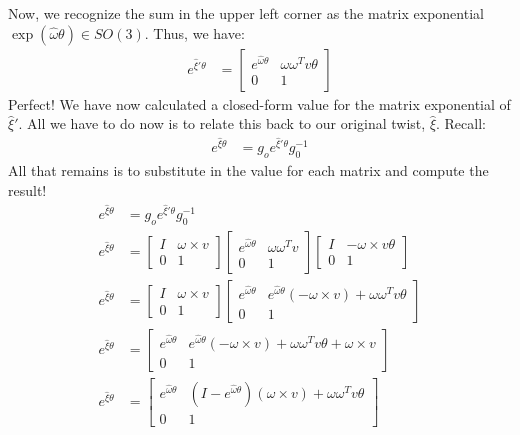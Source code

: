 \documentclass[oneside]{book}
\begin{document}
Now, we recognize the sum in the upper left corner as the matrix exponential $\exp(\hat\omega \theta) \in SO(3)$. Thus, we have:
\begin{align}
    e^{\hat\xi'\theta}
    &= 
    \begin{bmatrix}
    e^{\hat\omega\theta} & \omega\omega^Tv\theta \\
    0 & 1
    \end{bmatrix}
\end{align}
Perfect! We have now calculated a closed-form value for the matrix exponential of $\hat\xi'$. All we have to do now is to relate this back to our original twist, $\hat\xi$. Recall:
\begin{align}
    e^{\hat\xi\theta} &= g_o e^{\hat\xi'\theta}g_0^{-1}
\end{align}
All that remains is to substitute in the value for each matrix and compute the result!
\begin{align}
    e^{\hat\xi\theta} &= g_o e^{\hat\xi'\theta}g_0^{-1}\\
    e^{\hat\xi\theta}&= \begin{bmatrix}
    I & \omega\times v\\
    0 & 1
    \end{bmatrix}
    \begin{bmatrix}
    e^{\hat\omega\theta} & \omega\omega^Tv\\
    0 & 1
    \end{bmatrix}
    \begin{bmatrix}
    I & -\omega\times v\theta\\
    0 & 1
    \end{bmatrix}\\
    e^{\hat\xi\theta}&=  
    \begin{bmatrix}
    I & \omega\times v\\
    0 & 1
    \end{bmatrix}
    \begin{bmatrix}
    e^{\hat\omega\theta} & e^{\hat\omega\theta}( -\omega\times v) + \omega\omega^Tv\theta\\
    0 & 1
    \end{bmatrix}\\
    e^{\hat\xi\theta}&= 
    \begin{bmatrix}
    e^{\hat\omega\theta} & e^{\hat\omega\theta}( -\omega\times v) + \omega\omega^Tv\theta + \omega\times v\\
    0 & 1
    \end{bmatrix}\\
    e^{\hat\xi\theta}&= 
    \begin{bmatrix}
    e^{\hat\omega\theta} & (I - e^{\hat\omega\theta})( \omega\times v) + \omega\omega^Tv\theta\\
    0 & 1
    \end{bmatrix}
\end{align}
\end{document}
